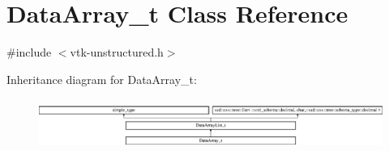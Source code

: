 \hypertarget{classDataArray__t}{}\section{Data\+Array\+\_\+t Class Reference}
\label{classDataArray__t}


{\ttfamily \#include $<$vtk-\/unstructured.\+h$>$}

Inheritance diagram for Data\+Array\+\_\+t\+:\begin{figure}[H]
\begin{center}
\leavevmode
\includegraphics[height=1.660079cm]{classDataArray__t}
\end{center}
\end{figure}
